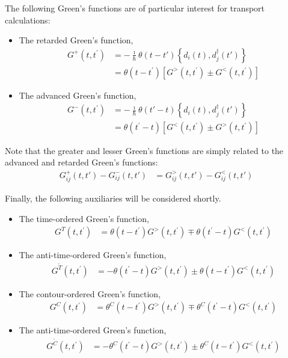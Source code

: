 The following Green's functions are of particular interest for transport calculations: 
\begin{itemize}
\item The retarded Green's function, \begin{align*}
G^+(t,t^\prime) &=
-\frac{\imath}{\hbar} \theta(t-t') \left\{ d_i(t), d^\dagger_j(t')\right\}
\\ &=\theta(t-t^\prime) \left[ G^>(t,t^\prime) \pm G^<(t,t^\prime)\right]
\end{align*}
\item The advanced Green's function, \begin{align*}
G^-(t,t^\prime) &=
-\frac{\imath}{\hbar} \theta(t'-t) \left\{ d_i(t), d^\dagger_j(t')\right\}
\\ &= \theta(t^\prime-t) \left[ G^<(t,t^\prime) \pm G^>(t,t^\prime)\right]
\end{align*}
\end{itemize}
Note that the greater and lesser Green's functions are simply related to the advanced and retarded Green's functions:
\begin{align*}
G^+_{ij}(t,t') - G^-_{ij}(t,t') &= G^>_{ij}(t,t') - G^<_{ij}(t,t')
\end{align*}

Finally, the following auxiliaries will be considered shortly.
\begin{itemize}
\item The time-ordered Green's function, \begin{align*}
G^T(t,t^\prime) &= \theta(t-t^\prime) G^>(t,t^\prime)  \mp \theta(t^\prime-t)G^<(t,t^\prime) 
\end{align*}
\item The anti-time-ordered Green's function, \begin{align*}
G^{\tilde{T}}(t,t^\prime) &= - \theta(t^\prime-t) G^>(t,t^\prime)  \pm \theta(t-t^\prime)G^<(t,t^\prime) 
\end{align*} 
\item The contour-ordered Green's function, \begin{align*}
G^C(t,t^\prime) &= \theta^C(t-t^\prime) G^>(t,t^\prime)  \mp \theta^C(t^\prime-t)G^<(t,t^\prime) 
\end{align*}
\item The anti-time-ordered Green's function, \begin{align*}
G^{\tilde{C}}(t,t^\prime) &= - \theta^C(t^\prime-t) G^>(t,t^\prime)  \pm \theta^C(t-t^\prime)G^<(t,t^\prime)
\end{align*} 
\end{itemize}

